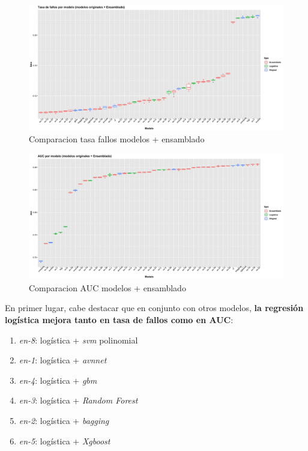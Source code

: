 \documentclass[
]{article}
\begin{document}
\begin{figure}[h!]

{\centering \includegraphics[width=0.99\linewidth,height=0.99\textheight,]{./charts/ensamblado_tasa_fallos_1} 

}

\caption{Comparacion tasa fallos modelos + ensamblado}\label{fig:unnamed-chunk-142}
\end{figure}
\begin{figure}[h!]

{\centering \includegraphics[width=0.99\linewidth,height=0.99\textheight,]{./charts/ensamblado_auc_1} 

}

\caption{Comparacion AUC modelos + ensamblado}\label{fig:unnamed-chunk-143}
\end{figure}

En primer lugar, cabe destacar que en conjunto con otros modelos,
\textbf{la regresión logística mejora tanto en tasa de fallos como en
AUC}:

\begin{enumerate}
\def\labelenumi{\arabic{enumi}.}
\item
  \emph{en-8}: logística + \emph{svm} polinomial
\item
  \emph{en-1}: logística + \emph{avnnet}
\item
  \emph{en-4}: logística + \emph{gbm}
\item
  \emph{en-3}: logística + \emph{Random Forest}
\item
  \emph{en-2}: logística + \emph{bagging}
\item
  \emph{en-5}: logística + \emph{Xgboost}
\end{enumerate}
\end{document}
